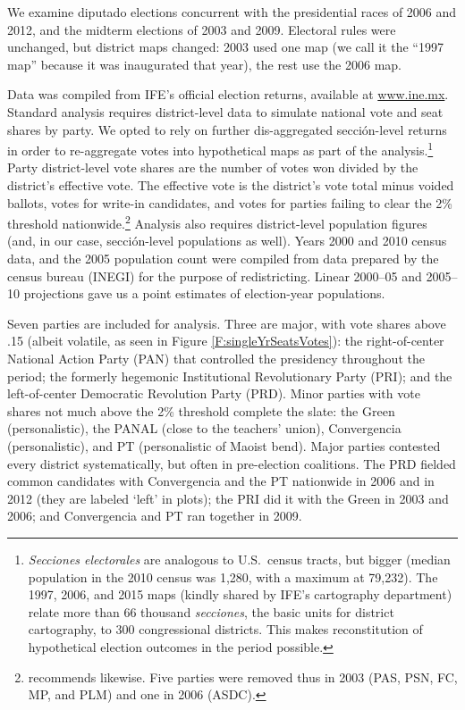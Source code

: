 \documentclass[letter,12pt]{article}
\begin{document}
We examine diputado elections concurrent with the presidential races of 2006 and 2012, and the midterm elections of 2003 and 2009. Electoral rules were unchanged, but district maps changed: 2003 used one map (we call it the ``1997 map'' because it was inaugurated that year), the rest use the 2006 map. 

Data was compiled from IFE's official election returns, available at \url{www.ine.mx}. Standard analysis requires district-level data to simulate national vote and seat shares by party. We opted to rely on further dis-aggregated secci\'on-level returns in order to re-aggregate votes into hypothetical maps as part of the analysis.\footnote{\emph{Secciones electorales} are analogous to U.S.\ census tracts, but bigger (median population in the 2010 census was 1,280, with a maximum at 79,232). The 1997, 2006, and 2015 maps (kindly shared by IFE's cartography department) relate more than 66 thousand \emph{secciones}, the basic units for district cartography, to 300 congressional districts. This makes reconstitution of hypothetical election outcomes in the period possible.} Party district-level vote shares are the number of votes won divided by the district's effective vote. The effective vote is the district's vote total minus voided ballots, votes for write-in candidates, and votes for parties failing to clear the 2\% threshold nationwide.\footnote{\citet[][:fn. 4]{linzerSeatVoteElasticity2012} recommends likewise. Five parties were removed thus in 2003 (PAS, PSN, FC, MP, and PLM) and one in 2006 (ASDC).} Analysis also requires district-level population figures (and, in our case, secci\'on-level populations as well). Years 2000 and 2010 census data, and the 2005 population count were compiled from data prepared by the census bureau (INEGI) for the purpose of redistricting. Linear 2000--05 and 2005--10 projections gave us a point estimates of election-year populations. 

Seven parties are included for analysis. Three are major, with vote shares above .15 (albeit volatile, as seen in Figure \ref{F:singleYrSeatsVotes}): the right-of-center National Action Party (PAN) that controlled the presidency throughout the period; the formerly hegemonic Institutional Revolutionary Party (PRI); and the left-of-center Democratic Revolution Party (PRD). Minor parties with vote shares not much above the 2\% threshold complete the slate: the Green (personalistic), the PANAL (close to the teachers' union), Convergencia (personalistic), and PT (personalistic of Maoist bend). Major parties contested every district systematically, but often in pre-election coalitions. The PRD fielded common candidates with Convergencia and the PT nationwide in 2006 and in 2012 (they are labeled `left' in plots); the PRI did it with the Green in 2003 and 2006; and Convergencia and PT ran together in 2009. 
\end{document}
